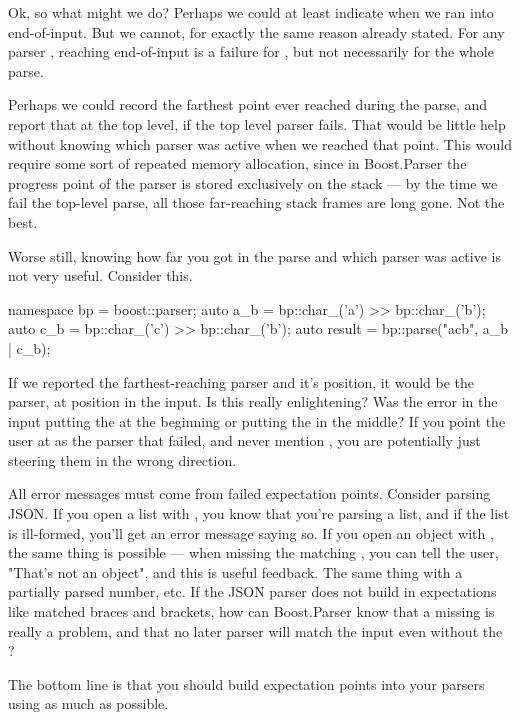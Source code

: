 \documentclass{MyBook}
\begin{document}
Ok, so what might we do? Perhaps we could at least indicate when we ran into end-of-input. But we cannot, for exactly the same reason already stated. For any parser , reaching end-of-input is a failure for , but not necessarily for the whole parse.

Perhaps we could record the farthest point ever reached during the parse, and report that at the top level, if the top level parser fails. That would be little help without knowing which parser was active when we reached that point. This would require some sort of repeated memory allocation, since in Boost.Parser the progress point of the parser is stored exclusively on the stack --- by the time we fail the top-level parse, all those far-reaching stack frames are long gone. Not the best.

Worse still, knowing how far you got in the parse and which parser was active is not very useful. Consider this.

\begin{code}
namespace bp = boost::parser;
auto a_b = bp::char_('a') >> bp::char_('b');
auto c_b = bp::char_('c') >> bp::char_('b');
auto result = bp::parse("acb", a_b | c_b);
\end{code}

If we reported the farthest-reaching parser and it's position, it would be the  parser, at position  in the input. Is this really enlightening? Was the error in the input putting the  at the beginning or putting the  in the middle? If you point the user at  as the parser that failed, and never mention , you are potentially just steering them in the wrong direction.

All error messages must come from failed expectation points. Consider parsing JSON. If you open a list with \ci{'{}{[}'{}}, you know that you're parsing a list, and if the list is ill-formed, you'll get an error message saying so. If you open an object with , the same thing is possible --- when missing the matching , you can tell the user, "That's not an object", and this is useful feedback. The same thing with a partially parsed number, etc. If the JSON parser does not build in expectations like matched braces and brackets, how can Boost.Parser know that a missing  is really a problem, and that no later parser will match the input even without the ?

\begin{marker}[title=Important ]
The bottom line is that you should build expectation points into your parsers using  as much as possible. 
\end{marker}
\end{document}
